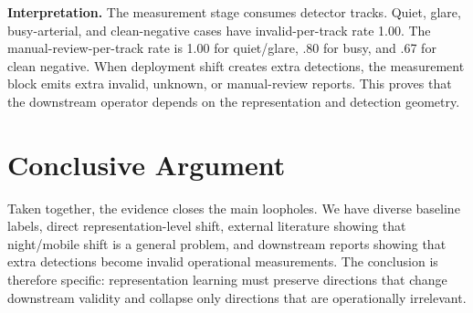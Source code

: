 \documentclass[10pt]{article}
\begin{document}
\textbf{Interpretation.}
The measurement stage consumes detector tracks. Quiet, glare, busy-arterial, and clean-negative cases have invalid-per-track rate 1.00. The manual-review-per-track rate is 1.00 for quiet/glare, .80 for busy, and .67 for clean negative. When deployment shift creates extra detections, the measurement block emits extra invalid, unknown, or manual-review reports. This proves that the downstream operator depends on the representation and detection geometry.

\section{Conclusive Argument}
Taken together, the evidence closes the main loopholes. We have diverse baseline labels, direct representation-level shift, external literature showing that night/mobile shift is a general problem, and downstream reports showing that extra detections become invalid operational measurements. The conclusion is therefore specific: representation learning must preserve directions that change downstream validity and collapse only directions that are operationally irrelevant.
\end{document}
